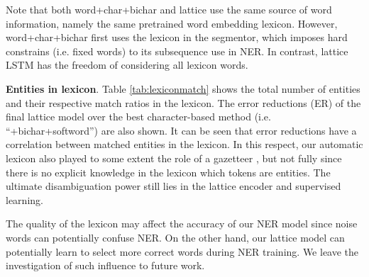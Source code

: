 \documentclass[11pt,a4paper]{article}
\begin{document}
\begin{CJK*}{UTF8}{gbsn}
Note that both word+char+bichar and lattice use the same source of word information, namely the same pretrained word embedding lexicon. However, word+char+bichar first uses the lexicon in the segmentor, which imposes hard constrains (i.e. fixed words) to its subsequence use in NER. In contrast, lattice LSTM has the freedom of considering all lexicon words.

\noindent \textbf{Entities in lexicon}. Table \ref{tab:lexiconmatch} shows the total number of entities and their respective match ratios in the lexicon. The error reductions (ER) of the final lattice model over the best character-based method (i.e. ``+bichar+softword'') are also shown. It can be seen that error reductions have a correlation between matched entities in the lexicon.  In this respect, our automatic lexicon also played to some extent the role of a gazetteer \cite{ratinov2009design,chiu2015named}, but not fully since there is no explicit knowledge in the lexicon which tokens are entities. The ultimate disambiguation power still lies in the lattice encoder and supervised learning. 

The quality of the lexicon may affect the accuracy of our NER model since noise words can potentially confuse NER. On the other hand, our lattice model can potentially learn to select more correct words during NER training. We leave the investigation of such influence to future work.



\begin{table}[!tp]
\begin{center}
\end{center}
\caption{Entities in lexicon.}
\label{tab:lexiconmatch}
\end{table}




\end{CJK*}
\end{document}
